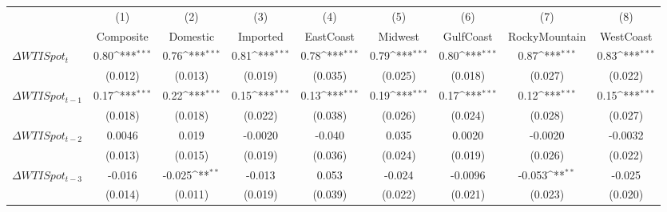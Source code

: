 {
\def\sym#1{\ifmmode^{#1}\else\(^{#1}\)\fi}
\begin{tabular}{l*{8}{c}}
\toprule
                    &\multicolumn{1}{c}{(1)}&\multicolumn{1}{c}{(2)}&\multicolumn{1}{c}{(3)}&\multicolumn{1}{c}{(4)}&\multicolumn{1}{c}{(5)}&\multicolumn{1}{c}{(6)}&\multicolumn{1}{c}{(7)}&\multicolumn{1}{c}{(8)}\\
                    &\multicolumn{1}{c}{Composite}&\multicolumn{1}{c}{Domestic}&\multicolumn{1}{c}{Imported}&\multicolumn{1}{c}{EastCoast}&\multicolumn{1}{c}{Midwest}&\multicolumn{1}{c}{GulfCoast}&\multicolumn{1}{c}{RockyMountain}&\multicolumn{1}{c}{WestCoast}\\
\midrule
$\Delta WTISpot_t$  &        0.80\sym{***}&        0.76\sym{***}&        0.81\sym{***}&        0.78\sym{***}&        0.79\sym{***}&        0.80\sym{***}&        0.87\sym{***}&        0.83\sym{***}\\
                    &     (0.012)         &     (0.013)         &     (0.019)         &     (0.035)         &     (0.025)         &     (0.018)         &     (0.027)         &     (0.022)         \\
$\Delta WTISpot_{t-1}$&        0.17\sym{***}&        0.22\sym{***}&        0.15\sym{***}&        0.13\sym{***}&        0.19\sym{***}&        0.17\sym{***}&        0.12\sym{***}&        0.15\sym{***}\\
                    &     (0.018)         &     (0.018)         &     (0.022)         &     (0.038)         &     (0.026)         &     (0.024)         &     (0.028)         &     (0.027)         \\
$\Delta WTISpot_{t-2}$&      0.0046         &       0.019         &     -0.0020         &      -0.040         &       0.035         &      0.0020         &     -0.0020         &     -0.0032         \\
                    &     (0.013)         &     (0.015)         &     (0.019)         &     (0.036)         &     (0.024)         &     (0.019)         &     (0.026)         &     (0.022)         \\
$\Delta WTISpot_{t-3}$&      -0.016         &      -0.025\sym{**} &      -0.013         &       0.053         &      -0.024         &     -0.0096         &      -0.053\sym{**} &      -0.025         \\
                    &     (0.014)         &     (0.011)         &     (0.019)         &     (0.039)         &     (0.022)         &     (0.021)         &     (0.023)         &     (0.020)         \\

\end{tabular}}
